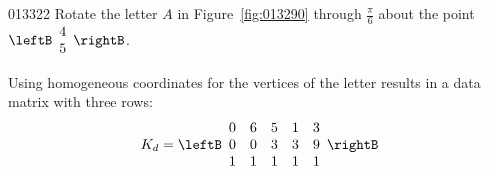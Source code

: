 \begin{example}{}{013322}
Rotate the letter $A$ in Figure~\ref{fig:013290} through $\frac{\pi}{6}$ about the point $\leftB
\begin{array}{c}
4\\
5
\end{array}
\rightB$.

\begin{solution}

Using homogeneous coordinates for the vertices of the letter results in a data matrix with three rows:
\begin{equation*}
K_{d} =  \leftB
\begin{array}{rrrrr}
0 & 6 & 5 & 1 & 3\\
0 & 0 & 3 & 3 & 9 \\
1 & 1 & 1 & 1 & 1
\end{array}
\rightB
\end{equation*}

\begin{wrapfigure}{l}{8cm} 
\vspace*{-5em}
\centering

\caption{\label{fig:013335}}
\end{wrapfigure}


\end{solution}
\end{example}
